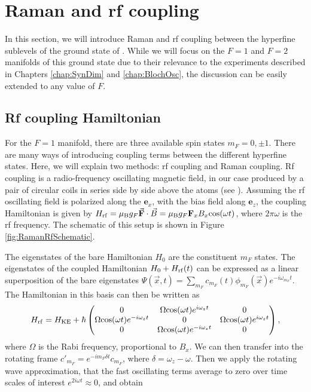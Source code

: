 \section{Raman and rf coupling}\label{sec:RamanRf}

In this section, we will introduce Raman and rf coupling between the hyperfine sublevels of the ground state of \Rb{}. While we will focus on the $F=1$ and $F=2$ manifolds of this ground state due to their relevance to the experiments described in Chapters \ref{chap:SynDim} and \ref{chap:BlochOsc}, the discussion can be easily extended to any value of $F$. 

\subsection{Rf coupling Hamiltonian}

	For the $F=1$ manifold, there are three available spin states $m_F = 0,\pm1$. There are many ways of introducing coupling terms between the different hyperfine states. Here, we will explain two methods: rf coupling and Raman coupling. Rf coupling is a radio-frequency oscillating magnetic field, in our case produced by a pair of circular coils in series side by side above the atoms (see \cite{KarinaThesis}). Assuming the rf oscillating field is polarized along the $\mathbf{e}_x$, with the bias field along $\mathbf{e}_z$, the coupling Hamiltonian is given by $H_{\rm rf} = \mu_{\rm B} g_F \vec{\mathbf{F}}\cdot{}\vec{B} = \mu_{\rm B} g_F \mathbf{F}_x B_x {\rm cos}(\omega t)$, where $2 \pi\omega$ is the rf frequency. The schematic of this setup is shown in Figure \ref{fig:RamanRfSchematic}.

The eigenstates of the bare Hamiltonian $H_0$ are the constituent $m_F$ states. The eigenstates of the coupled Hamiltonian $H_0 + H_{\rm rf}(t)$ can be expressed as a linear superposition of the bare eigenstates $\Psi(\vec{x},t)=\sum_{m_F}c_{m_F}(t)\phi_{m_F}(\vec{x})e^{-i\omega_{m_F}t}$. The Hamiltonian in this basis can then be written as\cite{LCT}
\begin{equation}
H_{\rm rf} = H_{\rm KE} + \hbar
 \begin{pmatrix} 0 & \Omega {\rm cos}(\omega t)e^{i\omega_zt}  & 0  \\ 
\Omega {\rm cos}(\omega t)e^{-i\omega_zt}  & 0 &  \Omega {\rm cos}(\omega t)e^{i\omega_zt} \\
 0 & \Omega {\rm cos}(\omega t)e^{-i\omega_zt}  & 0  \\
 \end{pmatrix} \\,
\end{equation}
where $\Omega$ is the Rabi frequency, proportional to $B_x$.
	 We can then transfer into the rotating frame $c'_{m_F} = e^{-i m_F \delta t}c_{m_F}$, where $\delta = \omega_z - \omega$. Then we apply the rotating wave approximation, that the fast oscillating terms average to zero over time scales of interest $e^{2i\omega t}\approx 0$, and obtain 

